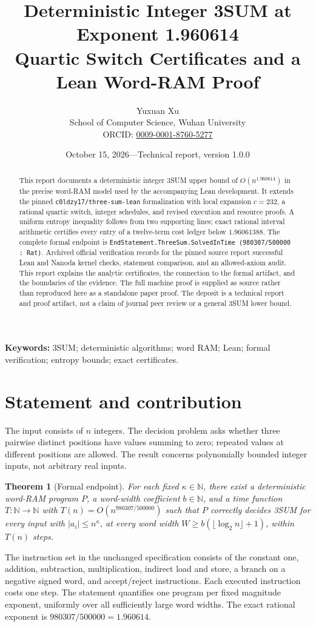 \documentclass[11pt,a4paper]{article}
\title{Deterministic Integer 3SUM at Exponent 1.960614\\[4pt]
\large Quartic Switch Certificates and a Lean Word-RAM Proof}
\author{Yuxuan Xu\\[3pt]
\small School of Computer Science, Wuhan University\\
\small ORCID: \href{https://orcid.org/0009-0001-8760-5277}{0009-0001-8760-5277}}
\date{October 15, 2026\quad---\quad Technical report, version 1.0.0}
\newtheorem{theorem}{Theorem}[section]
\newcommand{\N}{\mathbb{N}}
\newcommand{\code}[1]{\texttt{#1}}
\begin{document}
\maketitle
\begin{abstract}
This report documents a deterministic integer 3SUM upper bound of
$O(n^{1.960614})$ in the precise word-RAM model used by the accompanying
Lean development. It extends the pinned \code{c0ldzy17/three-sum-lean}
formalization with local expansion $c=232$, a rational quartic switch,
integer schedules, and revised execution and resource proofs. A uniform
entropy inequality follows from two supporting lines; exact rational
interval arithmetic certifies every entry of a twelve-term cost ledger
below $1.96061388$. The complete formal endpoint is
\code{EndStatement.ThreeSum.SolvedInTime (980307/500000 : Rat)}.
Archived official verification records for the pinned source report
successful Lean and Nanoda kernel checks, statement comparison, and an
allowed-axiom audit. This report explains the analytic certificates,
the connection to the formal artifact, and the boundaries of the evidence.
The full machine proof is supplied as source rather than reproduced here
as a standalone paper proof. The deposit is a technical report and proof
artifact, not a claim of journal peer review or a general 3SUM lower bound.
\end{abstract}
\noindent\textbf{Keywords:} 3SUM; deterministic algorithms; word RAM;
Lean; formal verification; entropy bounds; exact certificates.

\section{Statement and contribution}
The input consists of $n$ integers. The decision problem asks whether
three pairwise distinct positions have values summing to zero; repeated
values at different positions are allowed. The result concerns
polynomially bounded integer inputs, not arbitrary real inputs.

\begin{theorem}[Formal endpoint]\label{thm:end}
For each fixed $\kappa\in\N$, there exist a deterministic word-RAM
program $P$, a word-width coefficient $b\in\N$, and a time function
$T:\N\to\N$ with $T(n)=O(n^{980307/500000})$ such that $P$ correctly
decides 3SUM for every input with $|a_i|\le n^\kappa$, at every word width
$W\ge b(\lfloor\log_2 n\rfloor+1)$, within $T(n)$ steps.
\end{theorem}

The instruction set in the unchanged specification consists of the
constant one, addition, subtraction, multiplication, indirect load and
store, a branch on a negative signed word, and accept/reject instructions.
Each executed instruction costs one step. The statement quantifies one
program per fixed magnitude exponent, uniformly over all sufficiently
large word widths. The exact rational exponent is $980307/500000=1.960614$.
\end{document}
